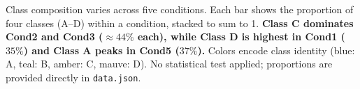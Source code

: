 \caption{Class composition varies across five conditions. Each bar shows the proportion of four classes (A--D) within a condition, stacked to sum to 1. \textbf{Class C dominates Cond2 and Cond3 (${\approx}44\%$ each), while Class D is highest in Cond1 ($35\%$) and Class A peaks in Cond5 ($37\%$).} Colors encode class identity (blue: A, teal: B, amber: C, mauve: D). No statistical test applied; proportions are provided directly in \texttt{data.json}.}

